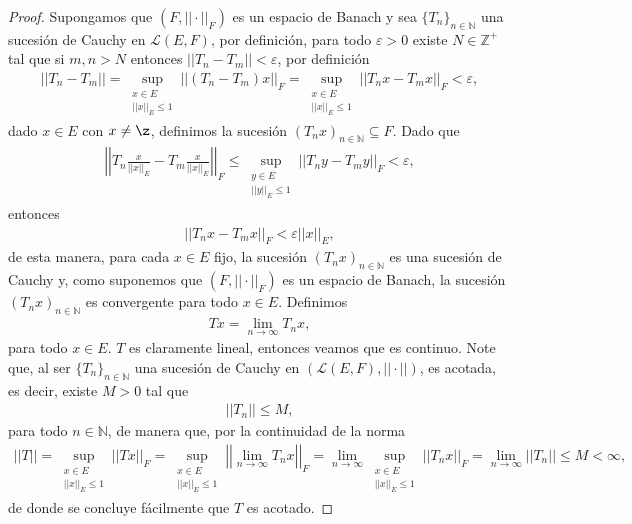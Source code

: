 \begin{proof}
Supongamos que $(F,||\cdot||_F)$ es un espacio de Banach y sea $\{T_n\}_{n \in \mathbb{N}}$ una sucesión de Cauchy en $\mathcal{L}(E,F)$, por definición, para todo $\varepsilon>0$ existe $N\in \mathbb{Z}^+$ tal que si $m,n>N$ entonces $||T_n-T_m||<\varepsilon$, por definición
    \begin{align*}
        ||T_n-T_m||=\sup_{\substack{x\in E\\||x||_E\leq 1}} ||(T_n-T_m) x||_F=\sup_{\substack{x\in E\\||x||_E\leq 1}}||T_nx-T_mx||_F<\varepsilon,
    \end{align*}
    dado $x \in E$ con $x\neq \z$, definimos la sucesión $(T_nx)_{n \in \mathbb{N}}\subseteq F$. Dado que
    \begin{align*}
        \left|\left|T_n\frac{x}{||x||_E}-T_m\frac{x}{||x||_E}\right|\right|_F\leq \sup_{\substack{y\in E\\||y||_E\leq 1}}||T_ny-T_my||_F<\varepsilon,
    \end{align*}
    entonces
    \begin{align*}
        ||T_nx-T_mx||_F< \varepsilon||x||_E,
    \end{align*}
    de esta manera, para cada $x\in E$ fijo, la sucesión $(T_nx)_{n \in \mathbb{N}}$ es una sucesión de Cauchy y, como suponemos que $(F,||\cdot||_F)$ es un espacio de Banach, la sucesión $(T_nx)_{n \in \mathbb{N}}$ es convergente para todo $x \in E$. Definimos
    \begin{align*}
        Tx=\lim_{n\to \infty}T_nx,
    \end{align*}
    para todo $x \in E$. $T$ es claramente lineal, entonces veamos que es continuo. Note que, al ser $\{T_n\}_{n \in \mathbb{N}}$ una sucesión de Cauchy en $(\mathcal{L}(E,F),||\cdot||)$, es acotada, es decir, existe $M>0$ tal que
    \begin{align*}
        ||T_n||\leq M,
    \end{align*}
    para todo $n \in \mathbb{N}$, de manera que, por la continuidad de la norma
    \begin{align*}
        ||T||=\sup_{\substack{x\in E\\||x||_E\leq 1}}||Tx||_F=\sup_{\substack{x\in E\\||x||_E\leq 1}}\left|\left|\lim_{n\to \infty}T_nx\right|\right|_F=\lim_{n\to \infty}\sup_{\substack{x\in E\\||x||_E\leq 1}}||T_nx||_F=\lim_{n\to \infty}||T_n||\leq M<\infty,
    \end{align*}
    de donde se concluye fácilmente que $T$ es acotado.
\end{proof}

